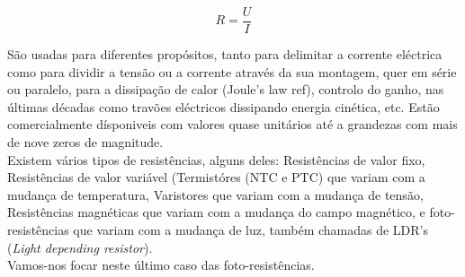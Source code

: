 \documentclass[12pt]{article}
\begin{document}
\begin{equation}\label{eq:Ohm}
    R = \frac{U}{I}
\end{equation}

São usadas para diferentes propósitos, tanto para delimitar a corrente eléctrica como para dividir a tensão ou a corrente através da sua montagem, quer em série ou paralelo, para a dissipação de calor  (Joule's law ref), controlo do ganho, nas últimas décadas como travões eléctricos dissipando energia cinética, etc. Estão comercialmente dísponiveis com valores quase unitários até a grandezas com mais de nove zeros de magnitude.\\
Existem vários tipos de resistências, alguns deles: Resistências de valor fixo, Resistências de valor variável (Termistóres (NTC e PTC) que variam com a mudança de temperatura, Varistores que variam com a mudança de tensão, Resistências magnéticas que variam com a mudança do campo magnético, e foto-resistências que variam com a mudança de luz, também chamadas de LDR's (\textit{Light depending resistor}).\\
Vamos-nos focar neste último caso das foto-resistências.\\
\end{document}
